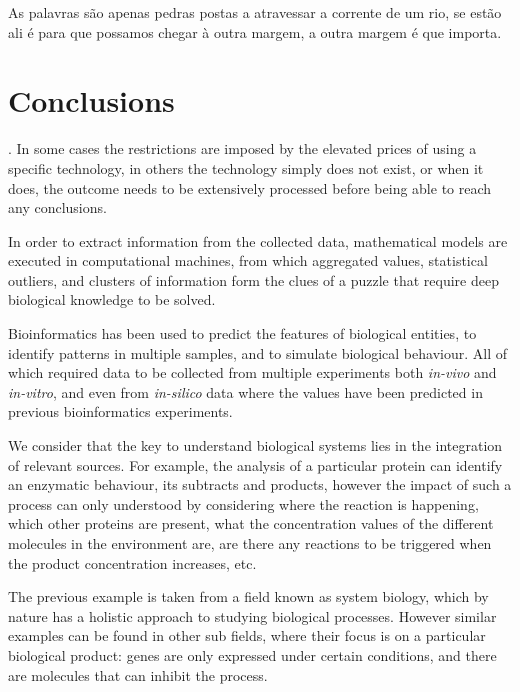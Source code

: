\begin{savequote}[75mm] 
As palavras são apenas pedras postas a atravessar a corrente de um rio, se estão ali é para que possamos chegar à outra margem, a outra margem é que importa.
\end{savequote}

\chapter{Conclusions}

. In some cases the restrictions are imposed by the elevated prices of using a specific technology, in others the technology simply does not exist, or when it does, the outcome needs to be extensively processed before being able to reach any conclusions. 

In order to extract information from the collected data, mathematical models are executed in computational machines, from which aggregated values, statistical outliers, and clusters of information form the clues of a puzzle that require deep biological knowledge to be solved.

Bioinformatics has been used to predict the features of biological entities, to identify patterns in multiple samples, and to simulate biological behaviour. All of which required data to be collected from multiple experiments both \emph{in-vivo} and \emph{in-vitro}, and even from \emph{in-silico} data where the values have been predicted in previous bioinformatics experiments.

We consider that the key to understand biological systems lies in the integration of relevant sources. For example,  the analysis of a particular protein can identify an enzymatic behaviour, its subtracts and products, however the impact of such a process can only understood by considering where the reaction is happening, which other proteins are present, what the concentration values of the different molecules in the environment are, are there any reactions to be triggered when the product concentration increases, etc.

The previous example is taken from a field known as system biology, which by nature has a holistic approach to studying biological processes. However similar examples can be found in other sub fields, where their focus is on a particular biological product: genes are only expressed under certain conditions, and there are molecules that can inhibit the process.

